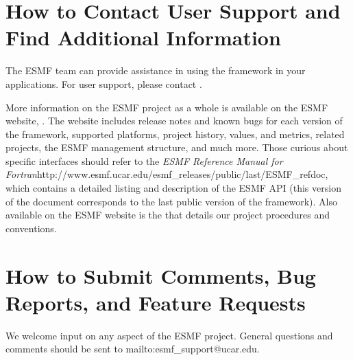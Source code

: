 \section{How to Contact User Support and Find Additional Information}
\label{sec:Support}
The ESMF team can provide assistance in using the framework in your
applications.
For user support, please contact 
.  

More information on the ESMF project as a whole is available on the 
ESMF website, .  
The website includes release notes and known bugs for each version of the
framework, supported platforms, project history, values, and metrics, related projects,
the ESMF management structure, and much more.  Those curious about specific 
interfaces should refer to the \htmladdnormallink
{{\it ESMF Reference Manual for Fortran}}{http://www.esmf.ucar.edu/esmf_releases/public/last/ESMF_refdoc}, which contains a detailed listing and description of 
the ESMF API (this version of the document corresponds to the last public version of the framework).  Also available on the ESMF website is the
that details our project procedures and conventions.

\section{How to Submit Comments, Bug Reports, and Feature Requests}
\label{sec:Submission}
We welcome input on any aspect of the ESMF project.  General
questions and comments should be sent to 
{mailto:esmf_support@ucar.edu}.


